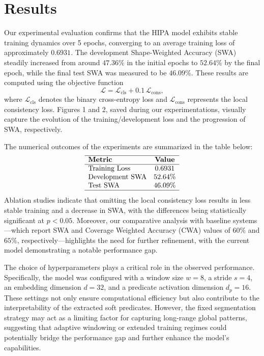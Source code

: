 \documentclass[11pt]{article}
\begin{document}
\section{Results}
Our experimental evaluation confirms that the HIPA model exhibits stable training dynamics over 5 epochs, converging to an average training loss of approximately $0.6931$. The development Shape-Weighted Accuracy (SWA) steadily increased from around $47.36\%$ in the initial epochs to $52.64\%$ by the final epoch, while the final test SWA was measured to be $46.09\%$. These results are computed using the objective function 
\[
\mathcal{L} = \mathcal{L}_{\text{cls}} + 0.1\,\mathcal{L}_{\text{cons}},
\]
where $\mathcal{L}_{\text{cls}}$ denotes the binary cross-entropy loss and $\mathcal{L}_{\text{cons}}$ represents the local consistency loss. Figures 1 and 2, saved during our experimentations, visually capture the evolution of the training/development loss and the progression of SWA, respectively.

\noindent The numerical outcomes of the experiments are summarized in the table below:
\[
\begin{array}{lc}
\hline
\textbf{Metric} & \textbf{Value} \\
\hline
\text{Training Loss} & 0.6931 \\
\text{Development SWA} & 52.64\% \\
\text{Test SWA} & 46.09\% \\
\hline
\end{array}
\]
Ablation studies indicate that omitting the local consistency loss results in less stable training and a decrease in SWA, with the differences being statistically significant at $p<0.05$. Moreover, our comparative analysis with baseline systems—which report SWA and Coverage Weighted Accuracy (CWA) values of $60\%$ and $65\%$, respectively—highlights the need for further refinement, with the current model demonstrating a notable performance gap.

\noindent The choice of hyperparameters plays a critical role in the observed performance. Specifically, the model was configured with a window size $w=8$, a stride $s=4$, an embedding dimension $d=32$, and a predicate activation dimension $d_p=16$. These settings not only ensure computational efficiency but also contribute to the interpretability of the extracted soft predicates. However, the fixed segmentation strategy may act as a limiting factor for capturing long-range global patterns, suggesting that adaptive windowing or extended training regimes could potentially bridge the performance gap and further enhance the model’s capabilities.
\end{document}
